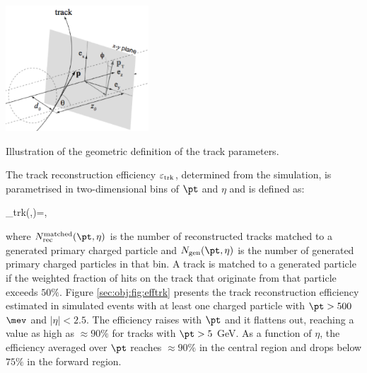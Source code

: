 \bfig[htb!]
\centering
\includegraphics[width=0.4\textwidth]{figures/Objects/trackparameters.png}
\captionsetup{width=0.85\textwidth} \caption{\small Illustration of the geometric definition of the track parameters.}
\label{sec:trk:fig:par}
\efig

The track reconstruction efficiency $\epsilon_{\rm trk}$, determined from the simulation, is parametrised in two-dimensional bins of $\pt$ and $\eta$ and
is defined as:

\be
\epsilon_{\rm trk}(\pt,\eta)=,
\ee

\noindent where $N_{\rm rec}^{\rm matched}(\pt,\eta)$  is the number of reconstructed tracks matched to a generated primary charged particle and $N_{\rm gen}(\pt,\eta)$ is the number of generated primary charged particles in that bin. A track is matched to a generated particle if the weighted fraction of hits on the track that originate from that particle exceeds $50\%$.
Figure \ref{sec:obj:fig:efftrk} presents the track reconstruction efficiency estimated in simulated events with at least one charged particle with $\pt >500$ $\mev$ and $|\eta|<2.5$. The efficiency raises with $\pt$  and it flattens out, reaching a value as high as $\approx 90\%$ for tracks with $\pt>5$ GeV. As a function of $\eta$, the efficiency averaged over $\pt$ reaches $\approx 90\%$ in the central region and drops below $75\%$ in the forward region. 

